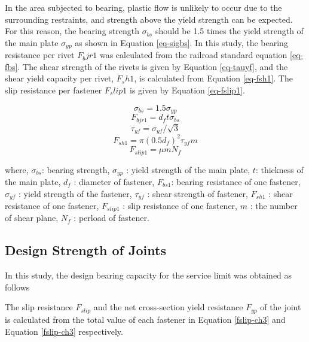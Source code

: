 In the area subjected to bearing, plastic flow is unlikely to occur due to the surrounding restraints, and strength above the yield strength can be expected. For this reason, the bearing strength $\sigma_{bs}$ should be 1.5 times the yield strength of the main plate $\sigma_{yp}$ as shown in Equation \ref{eq-sigbs}. In this study, the bearing resistance per rivet $F_bjr1$ was calculated from the railroad standard equation \ref{eq-fbs}. The shear strength of the rivets is given by Equation \ref{eq-tauyf}, and the shear yield capacity per rivet, $F_sh1$, is calculated from Equation \ref{eq-fsh1}. The slip resistance per fastener $F_slip1$ is given by Equation \ref{eq-fslip1}.

\begin{equation}\label{eq-sigbs}
    \sigma_{bs}=1.5\sigma_{yp}
\end{equation}
\begin{equation}\label{eq-fbs}
    F_{bjr1}=d_f t\sigma_{bs}
\end{equation}
\begin{equation}\label{eq-tauyf}
    \tau_{yf}=\sigma_{yf}/\sqrt{3}
\end{equation}
\begin{equation}\label{eq-fsh1}
    F_{sh1}=\pi (0.5d_f)^2 \tau_{yf} m
\end{equation}
\begin{equation}\label{eq-fslip1}
    F_{slip1}=\mu m N_f
\end{equation}

where, $\sigma_{bs}$: bearing strength, $\sigma_{yp}$ : yield strength of the main plate, $t$: thickness of the main plate, $d_f$ : diameter of fastener, $F_{bs1}$: bearing resistance of one fastener, $\sigma_{yf}$ : yield strength of the fastener, $\tau_{yf}$ : shear strength of fastener, $F_{sh1}$ : shear resistance of one fastener, $F_{slip1}$ : slip resistance of one fastener, $m$ : the number of shear plane, $N_f$ : perload of fastener.


\subsection{Design Strength of Joints}

In this study, the design bearing capacity for the service limit was obtained as follows

The slip resistance $F_{slip}$ and the net cross-section yield resistance 
$F_{yp}$ of the joint is calculated from the total value of each fastener in Equation \ref{fslip-ch3} and Equation \ref{fslip-ch3} respectively.


